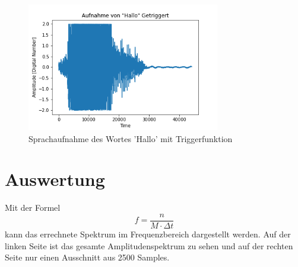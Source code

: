 \documentclass[12pt, oneside, a4paper, \docLanguage]{report}
\begin{document}
\begin{figure}[H]
	\centering\small
	\includegraphics[width=0.75\textwidth]{media/AufnahmeHalloGetriggert.png}
	\caption{Sprachaufnahme des Wortes 'Hallo' mit Triggerfunktion}
	\label{fig:VERSUCH_1_halloTriggered}
\end{figure}

\section{Auswertung}
\label{chap:VERSUCH_1_AUSWERTUNG}
Mit der Formel
\begin{equation*}
    f = \frac{n}{M \cdot \Delta t}
\end{equation*}
kann das errechnete Spektrum im Frequenzbereich dargestellt werden. Auf der linken Seite ist das gesamte Amplitudenspektrum zu sehen und auf der rechten Seite nur einen Ausschnitt aus 2500 Samples.
\end{document}

